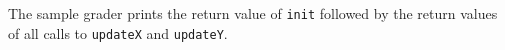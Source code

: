 The sample grader prints the return value of \texttt{init} followed by the return values of all calls to \texttt{updateX} and \texttt{updateY}.